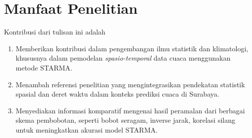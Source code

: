 \section{Manfaat Penelitian}
Kontribusi dari tulisan ini adalah
\begin{enumerate}
    \item Memberikan kontribusi dalam pengembangan ilmu statistik dan klimatologi, khususnya dalam pemodelan \textit{spasio-temporal} data cuaca menggunakan metode STARMA.
    \item Menambah referensi penelitian yang mengintegrasikan pendekatan statistik spasial dan deret waktu dalam konteks prediksi cuaca di Surabaya.
    \item Menyediakan informasi komparatif mengenai hasil peramalan dari berbagai skema pembobotan, seperti bobot seragam, inverse jarak, korelasi silang untuk meningkatkan akurasi model STARMA. 
\end{enumerate}